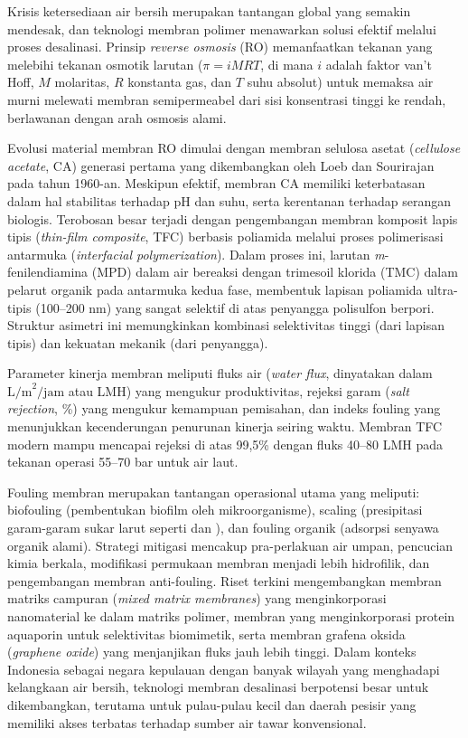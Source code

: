 \documentclass[12pt,a4paper,openany]{book}
\begin{document}
Krisis ketersediaan air bersih merupakan tantangan global yang semakin mendesak, dan teknologi membran polimer menawarkan solusi efektif melalui proses desalinasi. Prinsip \textit{reverse osmosis} (RO) memanfaatkan tekanan yang melebihi tekanan osmotik larutan ($\pi = iMRT$, di mana $i$ adalah faktor van't Hoff, $M$ molaritas, $R$ konstanta gas, dan $T$ suhu absolut) untuk memaksa air murni melewati membran semipermeabel dari sisi konsentrasi tinggi ke rendah, berlawanan dengan arah osmosis alami.

Evolusi material membran RO dimulai dengan membran selulosa asetat (\textit{cellulose acetate}, CA) generasi pertama yang dikembangkan oleh Loeb dan Sourirajan pada tahun 1960-an. Meskipun efektif, membran CA memiliki keterbatasan dalam hal stabilitas terhadap pH dan suhu, serta kerentanan terhadap serangan biologis. Terobosan besar terjadi dengan pengembangan membran komposit lapis tipis (\textit{thin-film composite}, TFC) berbasis poliamida melalui proses polimerisasi antarmuka (\textit{interfacial polymerization}). Dalam proses ini, larutan \textit{m}-fenilendiamina (MPD) dalam air bereaksi dengan trimesoil klorida (TMC) dalam pelarut organik pada antarmuka kedua fase, membentuk lapisan poliamida ultra-tipis (100--200 nm) yang sangat selektif di atas penyangga polisulfon berpori. Struktur asimetri ini memungkinkan kombinasi selektivitas tinggi (dari lapisan tipis) dan kekuatan mekanik (dari penyangga).

Parameter kinerja membran meliputi fluks air (\textit{water flux}, dinyatakan dalam $\text{L/m}^2\text{/jam}$ atau LMH) yang mengukur produktivitas, rejeksi garam (\textit{salt rejection}, \%) yang mengukur kemampuan pemisahan, dan indeks fouling yang menunjukkan kecenderungan penurunan kinerja seiring waktu. Membran TFC modern mampu mencapai rejeksi  di atas 99,5\% dengan fluks 40--80 LMH pada tekanan operasi 55--70 bar untuk air laut.

Fouling membran merupakan tantangan operasional utama yang meliputi: biofouling (pembentukan biofilm oleh mikroorganisme), scaling (presipitasi garam-garam sukar larut seperti  dan ), dan fouling organik (adsorpsi senyawa organik alami). Strategi mitigasi mencakup pra-perlakuan air umpan, pencucian kimia berkala, modifikasi permukaan membran menjadi lebih hidrofilik, dan pengembangan membran anti-fouling. Riset terkini mengembangkan membran matriks campuran (\textit{mixed matrix membranes}) yang menginkorporasi nanomaterial ke dalam matriks polimer, membran yang menginkorporasi protein aquaporin untuk selektivitas biomimetik, serta membran grafena oksida (\textit{graphene oxide}) yang menjanjikan fluks jauh lebih tinggi. Dalam konteks Indonesia sebagai negara kepulauan dengan banyak wilayah yang menghadapi kelangkaan air bersih, teknologi membran desalinasi berpotensi besar untuk dikembangkan, terutama untuk pulau-pulau kecil dan daerah pesisir yang memiliki akses terbatas terhadap sumber air tawar konvensional.
\end{document}
